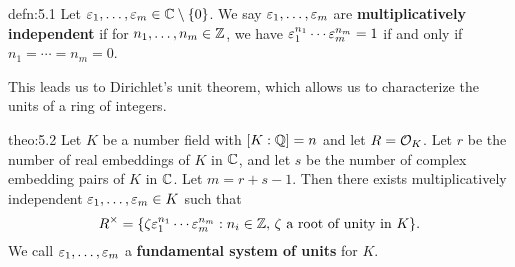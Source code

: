 \begin{defn}{defn:5.1}
    Let $\varepsilon_1, \dots, \varepsilon_m \in \mathbb{C} \setminus \{0\}$. We say
    $\varepsilon_1, \dots, \varepsilon_m$ are {\bf multiplicatively independent} 
    if for $n_1, \dots, n_m \in \mathbb{Z}$, we have 
    $\varepsilon_1^{n_1} \cdots \varepsilon_m^{n_m} = 1$ if and only if 
    $n_1 = \cdots = n_m = 0$. 
\end{defn}\vspace{-0.25cm}

This leads us to Dirichlet's unit theorem, which allows us to characterize 
the units of a ring of integers.

\begin{theo}{theo:5.2}
    Let $K$ be a number field with $[K : \mathbb{Q}] = n$ and let $R = {\cal O}_K$. 
    Let $r$ be the number of real embeddings of $K$ in $\mathbb{C}$, 
    and let $s$ be the number of complex embedding pairs of $K$ in $\mathbb{C}$. 
    Let $m = r + s - 1$. Then there exists multiplicatively independent 
    $\varepsilon_1, \dots, \varepsilon_m \in K$ such that 
    \[ R^\times = \{\zeta \varepsilon_1^{n_1} \cdots \varepsilon_m^{n_m} : n_i \in \mathbb{Z},\, 
    \zeta \text{ a root of unity in $K$}\}. \] 
    We call $\varepsilon_1, \dots, \varepsilon_m$ a {\bf fundamental system of units} for $K$.
\end{theo}\vspace{-0.25cm}

